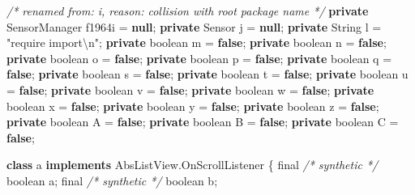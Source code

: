 \documentclass[
]{article}
\newenvironment{Shaded}{}{}
\newcommand{\BuiltInTok}[1]{\textcolor[rgb]{0.00,0.50,0.00}{#1}}
\newcommand{\CommentTok}[1]{\textcolor[rgb]{0.38,0.63,0.69}{\textit{#1}}}
\newcommand{\DataTypeTok}[1]{\textcolor[rgb]{0.56,0.13,0.00}{#1}}
\newcommand{\FunctionTok}[1]{\textcolor[rgb]{0.02,0.16,0.49}{#1}}
\newcommand{\KeywordTok}[1]{\textcolor[rgb]{0.00,0.44,0.13}{\textbf{#1}}}
\newcommand{\NormalTok}[1]{#1}
\newcommand{\OperatorTok}[1]{\textcolor[rgb]{0.40,0.40,0.40}{#1}}
\newcommand{\SpecialCharTok}[1]{\textcolor[rgb]{0.25,0.44,0.63}{#1}}
\newcommand{\StringTok}[1]{\textcolor[rgb]{0.25,0.44,0.63}{#1}}
\begin{document}
\begin{Shaded}
\begin{Highlighting}[]
    \CommentTok{/* renamed from: i, reason: collision with root package name */}
    \KeywordTok{private}\NormalTok{ SensorManager f1964i }\OperatorTok{=} \KeywordTok{null}\OperatorTok{;}
    \KeywordTok{private}\NormalTok{ Sensor j }\OperatorTok{=} \KeywordTok{null}\OperatorTok{;}
    \KeywordTok{private} \BuiltInTok{String}\NormalTok{ l }\OperatorTok{=} \StringTok{"require \textquotesingle{}import\textquotesingle{}}\SpecialCharTok{\textbackslash{}n}\StringTok{"}\OperatorTok{;}
    \KeywordTok{private} \DataTypeTok{boolean}\NormalTok{ m }\OperatorTok{=} \KeywordTok{false}\OperatorTok{;}
    \KeywordTok{private} \DataTypeTok{boolean}\NormalTok{ n }\OperatorTok{=} \KeywordTok{false}\OperatorTok{;}
    \KeywordTok{private} \DataTypeTok{boolean}\NormalTok{ o }\OperatorTok{=} \KeywordTok{false}\OperatorTok{;}
    \KeywordTok{private} \DataTypeTok{boolean}\NormalTok{ p }\OperatorTok{=} \KeywordTok{false}\OperatorTok{;}
    \KeywordTok{private} \DataTypeTok{boolean}\NormalTok{ q }\OperatorTok{=} \KeywordTok{false}\OperatorTok{;}
    \KeywordTok{private} \DataTypeTok{boolean}\NormalTok{ s }\OperatorTok{=} \KeywordTok{false}\OperatorTok{;}
    \KeywordTok{private} \DataTypeTok{boolean}\NormalTok{ t }\OperatorTok{=} \KeywordTok{false}\OperatorTok{;}
    \KeywordTok{private} \DataTypeTok{boolean}\NormalTok{ u }\OperatorTok{=} \KeywordTok{false}\OperatorTok{;}
    \KeywordTok{private} \DataTypeTok{boolean}\NormalTok{ v }\OperatorTok{=} \KeywordTok{false}\OperatorTok{;}
    \KeywordTok{private} \DataTypeTok{boolean}\NormalTok{ w }\OperatorTok{=} \KeywordTok{false}\OperatorTok{;}
    \KeywordTok{private} \DataTypeTok{boolean}\NormalTok{ x }\OperatorTok{=} \KeywordTok{false}\OperatorTok{;}
    \KeywordTok{private} \DataTypeTok{boolean}\NormalTok{ y }\OperatorTok{=} \KeywordTok{false}\OperatorTok{;}
    \KeywordTok{private} \DataTypeTok{boolean}\NormalTok{ z }\OperatorTok{=} \KeywordTok{false}\OperatorTok{;}
    \KeywordTok{private} \DataTypeTok{boolean}\NormalTok{ A }\OperatorTok{=} \KeywordTok{false}\OperatorTok{;}
    \KeywordTok{private} \DataTypeTok{boolean}\NormalTok{ B }\OperatorTok{=} \KeywordTok{false}\OperatorTok{;}
    \KeywordTok{private} \DataTypeTok{boolean}\NormalTok{ C }\OperatorTok{=} \KeywordTok{false}\OperatorTok{;}

    \KeywordTok{class}\NormalTok{ a }\KeywordTok{implements}\NormalTok{ AbsListView}\OperatorTok{.}\FunctionTok{OnScrollListener} \OperatorTok{\{}
        \DataTypeTok{final} \CommentTok{/* synthetic */} \DataTypeTok{boolean}\NormalTok{ a}\OperatorTok{;}
        \DataTypeTok{final} \CommentTok{/* synthetic */} \DataTypeTok{boolean}\NormalTok{ b}\OperatorTok{;}


\end{Highlighting}
\end{Shaded}
\end{document}
